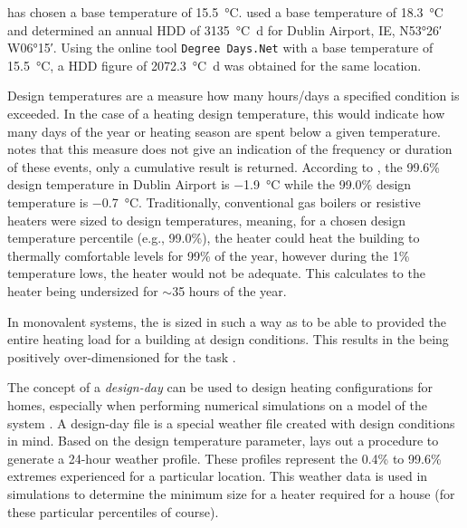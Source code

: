  has chosen a base temperature of \SI{15.5}{\celsius}.  used a base temperature of \SI{18.3}{\celsius} and determined an annual \ac{HDD} of \SI{3135}{\celsius\day} for Dublin Airport, IE, N\ang{53;26;} W\ang{06;15;}. Using the online tool \texttt{Degree Days.Net} \cite{degreedays} with a base temperature of \SI{15.5}{\celsius}, a \ac{HDD} figure of \SI{2072.3}{\celsius\day} was obtained for the same location.  

Design temperatures are a measure how many hours/days a specified condition is exceeded. In the case of a heating design temperature, this would indicate how many days of the year or heating season are spent below a given temperature.  notes that this measure does not give an indication of the frequency or duration of these events, only a cumulative result is returned. According to , the 99.6\% design temperature in Dublin Airport is \SI{-1.9}{\celsius} while the 99.0\% design temperature is \SI{-0.7}{\celsius}. Traditionally, conventional gas boilers or resistive heaters were sized to design temperatures, meaning, for a chosen design temperature percentile (e.g., 99.0\%), the heater could heat the building to thermally comfortable levels for 99\% of the year, however during the 1\% temperature lows, the heater would not be adequate. This calculates to the heater being undersized for $\sim$35 hours of the year. 

In monovalent systems, the \HP is sized in such a way as to be able to provided the entire heating load for a building at design conditions. This results in the \HP being positively over-dimensioned for the task \cite{klein_numerical_2014}. 

The concept of a \textit{design-day} can be used to design heating configurations for homes, especially when performing numerical simulations on a model of the system \cite{rauschkolb_cost-optimal_2020}. A design-day file is a special weather file created with design conditions in mind. Based on the design temperature parameter,  lays out a procedure to generate a 24-hour weather profile. These profiles represent the 0.4\% to 99.6\% extremes experienced for a particular location. This weather data is used in simulations to determine the minimum size for a heater required for a house (for these particular percentiles of course). 

